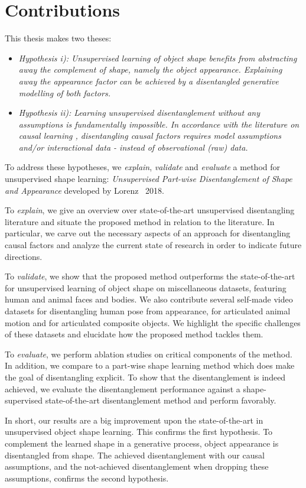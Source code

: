 \section{Contributions}
	This thesis makes two theses:
	\begin{itemize}
		\item  \textit{Hypothesis \emph{i)}: Unsupervised learning of object shape benefits from abstracting away the complement of shape, namely the object appearance. Explaining away the appearance factor can be achieved by a disentangled generative modelling of both factors.}
		\item \textit{Hypothesis \emph{ii)}: Learning unsupervised disentanglement without any assumptions is fundamentally impossible. In accordance with the literature on causal learning \cite{pearl18impediments}, disentangling causal factors requires model assumptions and/or interactional data - instead of observational (raw) data.}
	\end{itemize}
	To address these hypotheses, we \textit{explain}, \textit{validate} and \textit{evaluate} a method for unsupervised shape learning: \textit{Unsupervised Part-wise Disentanglement of Shape and Appearance} developed by Lorenz \etal\ 2018.


	To \textit{explain}, we give an overview over state-of-the-art unsupervised disentangling literature and situate the proposed method in relation to the literature. In particular, we carve out the necessary aspects of an approach for disentangling causal factors and analyze the current state of research in order to indicate future directions.


	To \textit{validate}, we show that the proposed method outperforms the state-of-the-art for unsupervised learning of object shape on miscellaneous datasets, featuring human and animal faces and bodies.
	We also contribute several self-made video datasets for disentangling human pose from appearance, for articulated animal motion and for articulated composite objects. We highlight the specific challenges of these datasets and elucidate how the proposed method tackles them.


	To \textit{evaluate}, we perform ablation studies on critical components of the method. In addition, we compare to a part-wise shape learning method which does make the goal of disentangling explicit.
	To show that the disentanglement is indeed achieved, we evaluate the disentanglement performance against a shape-supervised state-of-the-art disentanglement method and perform favorably.


	In short, our results are a big improvement upon the state-of-the-art in unsupervised object shape learning. This confirms the first hypothesis. To complement the learned shape in a generative process, object appearance is disentangled from shape. The achieved disentanglement with our causal assumptions, and the not-achieved disentanglement when dropping these assumptions, confirms the second hypothesis.
